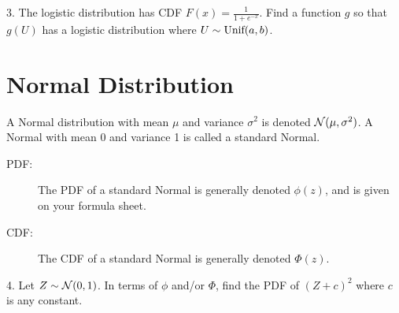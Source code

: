 \documentclass{article}
\begin{document}
3. The logistic distribution has CDF $F(x) = \frac{1}{1+e^{-x}}$. Find a function $g$ so that $g(U)$ has a logistic distribution where $U \sim \textrm{Unif}(a,b)$. 



\section{Normal Distribution}

A Normal distribution with mean $\mu$ and variance $\sigma^2$ is denoted $\mathcal{N}(\mu, \sigma^2)$. A Normal with mean 0 and variance 1 is called a standard Normal.

\begin{description}

\item[PDF:] The PDF of a standard Normal is generally denoted $\phi(z)$, and is given on your formula sheet.

\item[CDF:] The CDF of a standard Normal is generally denoted $\Phi(z)$.

\end{description}
4. Let $Z \sim \mathcal{N}(0,1)$. In terms of $\phi$ and/or $\Phi$, find the PDF of $(Z+c)^2$ where $c$ is any constant.

\end{document}
